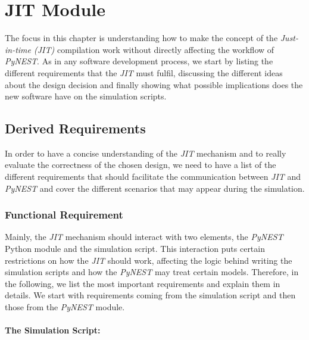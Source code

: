 
\chapter{JIT Module}
The focus in this chapter is understanding how to make the concept of the \emph{Just-in-time (JIT)} compilation work without directly affecting the workflow of \emph{PyNEST}. As in any software development process, we start by listing the different requirements that the \emph{JIT} must fulfil, discussing the different ideas about the design decision and finally showing what possible implications does the new software have on the simulation scripts.

 \label{chap:jit}
\section{Derived Requirements}
In order to have a concise understanding of the \emph{JIT} mechanism and to really evaluate the correctness of the chosen design, we need to have a list of the different requirements that should facilitate the communication between \emph{JIT} and \emph{PyNEST} and cover the different scenarios that may appear during the simulation. 
\subsection{Functional Requirement}



Mainly, the \emph{JIT} mechanism should interact with two elements, the \emph{PyNEST} Python module and the simulation script. This interaction puts certain restrictions on how the \emph{JIT} should work, affecting the logic behind writing the simulation scripts and how the \emph{PyNEST} may treat certain models. Therefore, in the following, we list the most important requirements and explain them in details. We start with requirements coming from the simulation script and then those from the \emph{PyNEST} module.

\subsubsection*{The Simulation Script:}

